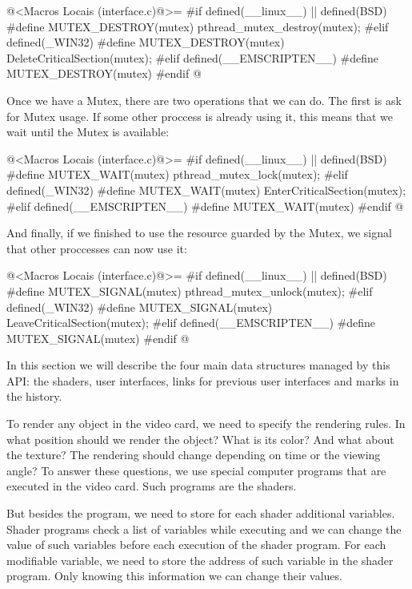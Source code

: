 \iniciocodigo
@<Macros Locais (interface.c)@>=
#if defined(__linux__) || defined(BSD)
#define MUTEX_DESTROY(mutex) pthread_mutex_destroy(mutex);
#elif defined(_WIN32)
#define MUTEX_DESTROY(mutex) DeleteCriticalSection(mutex);
#elif defined(__EMSCRIPTEN__)
#define MUTEX_DESTROY(mutex)
#endif
@
\fimcodigo

Once we have a Mutex, there are two operations that we can do. The
first is ask for Mutex usage. If some other proccess is already using
it, this means that we wait until the Mutex is available:

\iniciocodigo
@<Macros Locais (interface.c)@>=
#if defined(__linux__) || defined(BSD)
#define MUTEX_WAIT(mutex) pthread_mutex_lock(mutex);
#elif defined(_WIN32)
#define MUTEX_WAIT(mutex) EnterCriticalSection(mutex);
#elif defined(__EMSCRIPTEN__)
#define MUTEX_WAIT(mutex)
#endif
@
\fimcodigo

And finally, if we finished to use the resource guarded by the Mutex,
we signal that other proccesses can now use it:

\iniciocodigo
@<Macros Locais (interface.c)@>=
#if defined(__linux__) || defined(BSD)
#define MUTEX_SIGNAL(mutex) pthread_mutex_unlock(mutex);
#elif defined(_WIN32)
#define MUTEX_SIGNAL(mutex) LeaveCriticalSection(mutex);
#elif defined(__EMSCRIPTEN__)
#define MUTEX_SIGNAL(mutex)
#endif
@
\fimcodigo


In this section we will describe the four main data structures managed
by this API: the shaders, user interfaces, links for previous user
interfaces and marks in the history.


To render any object in the video card, we need to specify the
rendering rules. In what position should we render the object? What is
its color? And what about the texture? The rendering should change
depending on time or the viewing angle? To answer these questions, we
use special computer programs that are executed in the video
card. Such programs are the shaders.

But besides the program, we need to store for each shader additional
variables. Shader programs check a list of variables while executing
and we can change the value of such variables before each execution of
the shader program. For each modifiable variable, we need to store the
address of such variable in the shader program. Only knowing this
information we can change their values.

